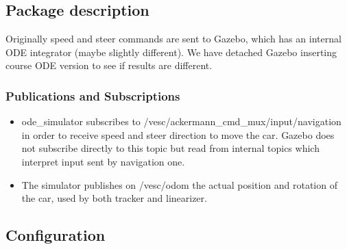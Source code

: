 \subsection{Package description}

Originally speed and steer commands are sent to Gazebo, which has an internal ODE integrator (maybe slightly different). We have detached Gazebo inserting course ODE version to see if results are different.

\subsubsection{Publications and Subscriptions}

\begin{itemize}
	\item ode\_simulator subscribes to /vesc/ackermann\_cmd\_mux/input/navigation in order to receive speed and steer direction to move the car. Gazebo does not subscribe directly to this topic but read from internal topics which interpret input sent by navigation one.
	\item The simulator publishes on /vesc/odom the actual position and rotation of the car, used by both tracker and linearizer.
\end{itemize}


\subsection{Configuration}


